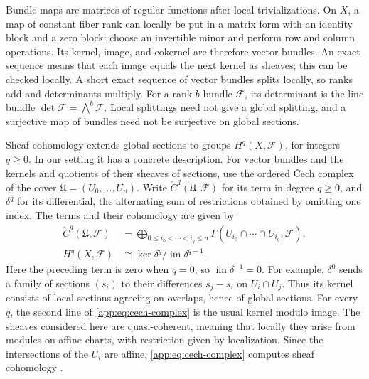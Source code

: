 \documentclass[12pt,reqno,a4paper]{amsart}
\numberwithin{equation}{section}
\numberwithin{figure}{section}
\theoremstyle{plain}
\theoremstyle{definition}
\begin{document}
Bundle maps are matrices of regular functions after local
trivializations. On $X$, a map of constant fiber rank can locally be
put in a matrix form with an identity block and a zero block:
choose an invertible minor and perform row and column operations.
Its kernel, image, and cokernel are therefore vector bundles.
An exact sequence means that each image equals the next kernel as
sheaves; this can be checked locally. A short exact sequence of vector
bundles splits locally, so ranks add and determinants multiply.
For a rank-$b$ bundle $\mathcal F$, its determinant is the line bundle
$\det\mathcal F=\bigwedge^b\mathcal F$.
Local splittings need not give a global splitting, and a surjective
map of bundles need not be surjective on global sections.

Sheaf cohomology extends global sections to groups $H^q(X,\mathcal F)$,
for integers $q\geq0$. In our setting it has a concrete description.
For vector bundles and the kernels and quotients of their sheaves of
sections, use the ordered \v Cech complex of the cover
$\mathfrak U=(U_0,\ldots,U_n)$. Write $\check C^q(\mathfrak U,\mathcal F)$
for its term in degree $q\geq0$, and $\delta^q$ for its differential,
the alternating sum of restrictions obtained by omitting one index.
The terms and their cohomology are given by
\begin{equation}\label{app:eq:cech-complex}
 \begin{aligned}
 \check C^q(\mathfrak U,\mathcal F)
   &=\bigoplus_{0\leq i_0<\cdots<i_q\leq n}
       \Gamma(U_{i_0}\cap\cdots\cap U_{i_q},\mathcal F),\\
 H^q(X,\mathcal F)&\cong\ker\delta^q/\operatorname{im}\delta^{q-1}.
 \end{aligned}
\end{equation}
Here the preceding term is zero when $q=0$, so
$\operatorname{im}\delta^{-1}=0$. For example, $\delta^0$ sends a family of
sections $(s_i)$ to their differences $s_j-s_i$ on $U_i\cap U_j$.
Thus its kernel consists of local sections agreeing on overlaps,
hence of global sections. For every $q$, the second line of
\eqref{app:eq:cech-complex} is the usual kernel modulo image.
The sheaves considered here are quasi-coherent, meaning that locally
they arise from modules on affine charts, with restriction given by
localization. Since the intersections of the $U_i$ are affine,
\eqref{app:eq:cech-complex} computes sheaf cohomology
\cite[Tag~01XD]{Stacks}.
\end{document}
